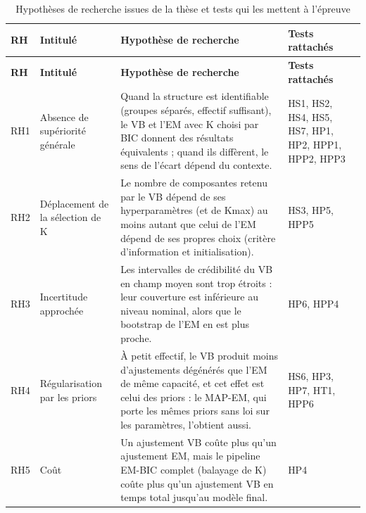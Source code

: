{\scriptsize
\setlength{\tabcolsep}{3pt}
\begin{longtable}{>{\raggedright\arraybackslash}p{1.00cm}>{\raggedright\arraybackslash}p{3.00cm}>{\raggedright\arraybackslash}p{8.30cm}>{\raggedright\arraybackslash}p{3.00cm}}
\caption{Hypothèses de recherche issues de la thèse et tests qui les mettent à l'épreuve}\label{tab:hypotheses_recherche}\\
\toprule
\textbf{RH} & \textbf{Intitulé} & \textbf{Hypothèse de recherche} & \textbf{Tests rattachés} \\
\midrule
\endfirsthead
\toprule
\textbf{RH} & \textbf{Intitulé} & \textbf{Hypothèse de recherche} & \textbf{Tests rattachés} \\
\midrule
\endhead
\bottomrule
\endfoot
RH1 & Absence de supériorité générale & Quand la structure est identifiable (groupes séparés, effectif suffisant), le VB et l'EM avec K choisi par BIC donnent des résultats équivalents ; quand ils diffèrent, le sens de l'écart dépend du contexte. & HS1, HS2, HS4, HS5, HS7, HP1, HP2, HPP1, HPP2, HPP3 \\
RH2 & Déplacement de la sélection de K & Le nombre de composantes retenu par le VB dépend de ses hyperparamètres (et de Kmax) au moins autant que celui de l'EM dépend de ses propres choix (critère d'information et initialisation). & HS3, HP5, HPP5 \\
RH3 & Incertitude approchée & Les intervalles de crédibilité du VB en champ moyen sont trop étroits : leur couverture est inférieure au niveau nominal, alors que le bootstrap de l'EM en est plus proche. & HP6, HPP4 \\
RH4 & Régularisation par les priors & À petit effectif, le VB produit moins d'ajustements dégénérés que l'EM de même capacité, et cet effet est celui des priors : le MAP-EM, qui porte les mêmes priors sans loi sur les paramètres, l'obtient aussi. & HS6, HP3, HP7, HT1, HPP6 \\
RH5 & Coût & Un ajustement VB coûte plus qu'un ajustement EM, mais le pipeline EM-BIC complet (balayage de K) coûte plus qu'un ajustement VB en temps total jusqu'au modèle final. & HP4 \\
\end{longtable}
}
